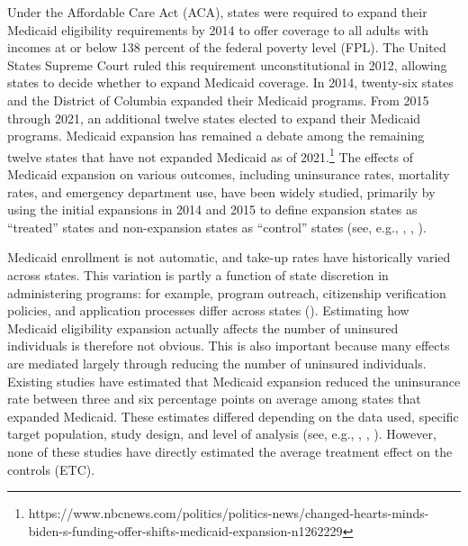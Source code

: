 \documentclass[aoas]{imsart}
\theoremstyle{plain}
\theoremstyle{remark}
\begin{document}
Under the Affordable Care Act (ACA), states were required to expand their Medicaid eligibility requirements by 2014 to offer coverage to all adults with incomes at or below 138 percent of the federal poverty level (FPL). The United States Supreme Court ruled this requirement unconstitutional in 2012, allowing states to decide whether to expand Medicaid coverage. In 2014, twenty-six states and the District of Columbia expanded their Medicaid programs. From 2015 through 2021, an additional twelve states elected to expand their Medicaid programs. Medicaid expansion has remained a debate among the remaining twelve states that have not expanded Medicaid as of 2021.\footnote{https://www.nbcnews.com/politics/politics-news/changed-hearts-minds-biden-s-funding-offer-shifts-medicaid-expansion-n1262229} The effects of Medicaid expansion on various outcomes, including uninsurance rates, mortality rates, and emergency department use, have been widely studied, primarily by using the initial expansions in 2014 and 2015 to define expansion states as ``treated'' states and non-expansion states as ``control'' states (see, e.g., \cite{courtemanche2017early}, \cite{miller2021medicaid}, \cite{ladhania2021effect}).

Medicaid enrollment is not automatic, and take-up rates have historically varied across states. This variation is partly a function of state discretion in administering programs: for example, program outreach, citizenship verification policies, and application processes differ across states (\cite{courtemanche2017early}). Estimating how Medicaid eligibility expansion actually affects the number of uninsured individuals is therefore not obvious. This is also important because many effects are mediated largely through reducing the number of uninsured individuals. Existing studies have estimated that Medicaid expansion reduced the uninsurance rate between three and six percentage points on average among states that expanded Medicaid. These estimates differed depending on the data used, specific target population, study design, and level of analysis (see, e.g., \cite{kaestner2017effects}, \cite{courtemanche2017early}, \cite{frean2017premium}). However, none of these studies have directly estimated the average treatment effect on the controls (ETC). 
\end{document}
